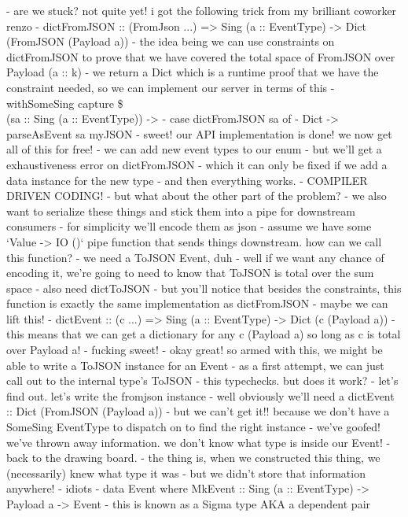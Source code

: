 - are we stuck? not quite yet! i got the following trick from my brilliant coworker renzo
  - dictFromJSON :: (FromJson ...) => Sing (a :: EventType) -> Dict (FromJSON (Payload a))
  - the idea being we can use constraints on dictFromJSON to prove that we have covered the total space of FromJSON over Payload (a :: k)
    - we return a Dict which is a runtime proof that we have the constraint needed, so we can implement our server in terms of this
- withSomeSing capture \$ \\(sa :: Sing (a :: EventType)) ->
  - case dictFromJSON sa of
    - Dict -> parseAsEvent sa myJSON
- sweet! our API implementation is done! we now get all of this for free!
  - we can add new event types to our enum
  - but we'll get a exhaustiveness error on dictFromJSON
  - which it can only be fixed if we add a data instance for the new type
  - and then everything works.
  - COMPILER DRIVEN CODING!
- but what about the other part of the problem?
  - we also want to serialize these things and stick them into a pipe for downstream consumers
  - for simplicity we'll encode them as json
  - assume we have some `Value -> IO ()` pipe function that sends things downstream. how can we call this function?
    - we need a ToJSON Event, duh
    - well if we want any chance of encoding it, we're going to need to know that ToJSON is total over the sum space
    - also need dictToJSON
  - but you'll notice that besides the constraints, this function is exactly the same implementation as dictFromJSON
    - maybe we can lift this!
      - dictEvent :: (c ...) => Sing (a :: EventType) -> Dict (c (Payload a))
    - this means that we can get a dictionary for any c (Payload a) so long as c is total over Payload a!
      - fucking sweet!
  - okay great! so armed with this, we might be able to write a ToJSON instance for an Event
    - as a first attempt, we can just call out to the internal type's ToJSON
    - this typechecks. but does it work?
    - let's find out. let's write the fromjson instance
      - well obviously we'll need a dictEvent :: Dict (FromJSON (Payload a))
      - but we can't get it!! because we don't have a SomeSing EventType to dispatch on to find the right instance
      - we've goofed! we've thrown away information. we don't know what type is inside our Event!
- back to the drawing board.
  - the thing is, when we constructed this thing, we (necessarily) knew what type it was
    - but we didn't store that information anywhere!
    - idiots
  - data Event where MkEvent :: Sing (a :: EventType) -> Payload a -> Event
  - this is known as a Sigma type AKA a dependent pair
